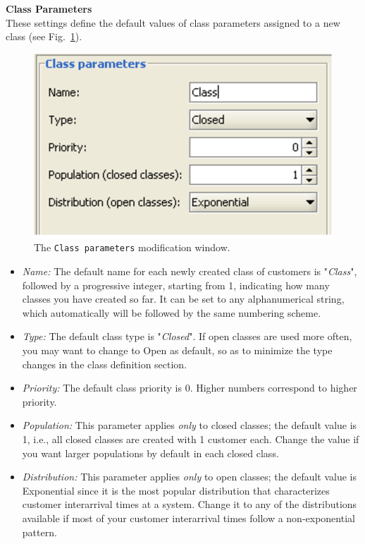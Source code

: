 \noindent \textbf{Class Parameters}\\
These settings define the default values of class parameters
assigned to a new class (see Fig.~\ref{fig:clparam}).
\begin{figure}[htb]
    \begin{center}
        \includegraphics[scale=.5]{img/jsimg/9.2.eps}
    \end{center}
    \caption{The \texttt{Class parameters} modification window.}
    \label{fig:clparam}
\end{figure}
\begin{itemize}
\item \emph{Name:} The default name for each newly created class
of customers is "\emph{Class}", followed by a progressive integer,
starting from 1, indicating how many classes you have created so
far. It can be set to any alphanumerical string, which
automatically will be followed by the same numbering scheme. \item
\emph{Type:} The default class type is "\emph{Closed}". If open
classes are used more often, you may want to change to Open as
default, so as to minimize the type changes in the class
definition section. \item \emph{Priority:} The default class
priority is 0. Higher numbers correspond to higher priority. \item
\emph{Population:} This parameter applies \emph{only} to closed
classes; the default value is 1, i.e., all closed classes are
created with 1 customer each. Change the value if you want larger
populations by default in each closed class. \item
\emph{Distribution:} This parameter applies \emph{only} to open
classes; the default value is Exponential since it is the most
popular distribution that characterizes customer interarrival
times at a system. Change it to any of the distributions available
if most of your customer interarrival times follow a
non-exponential pattern.
\end{itemize}

